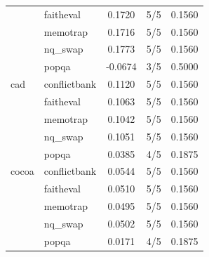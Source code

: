 \begin{tabular}{llccc}
 & faitheval & 0.1720 & 5/5 & 0.1560 \\
 & memotrap & 0.1716 & 5/5 & 0.1560 \\
 & nq_swap & 0.1773 & 5/5 & 0.1560 \\
 & popqa & -0.0674 & 3/5 & 0.5000 \\
cad & conflictbank & 0.1120 & 5/5 & 0.1560 \\
 & faitheval & 0.1063 & 5/5 & 0.1560 \\
 & memotrap & 0.1042 & 5/5 & 0.1560 \\
 & nq_swap & 0.1051 & 5/5 & 0.1560 \\
 & popqa & 0.0385 & 4/5 & 0.1875 \\
cocoa & conflictbank & 0.0544 & 5/5 & 0.1560 \\
 & faitheval & 0.0510 & 5/5 & 0.1560 \\
 & memotrap & 0.0495 & 5/5 & 0.1560 \\
 & nq_swap & 0.0502 & 5/5 & 0.1560 \\
 & popqa & 0.0171 & 4/5 & 0.1875 \\
\bottomrule
\end{tabular}
